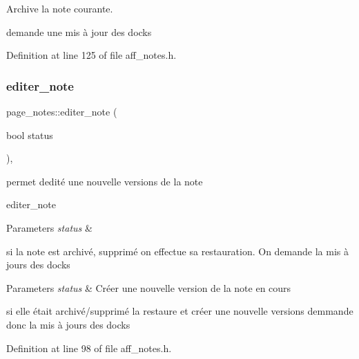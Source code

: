 Archive la note courante. 

demande une mis à jour des docks 

Definition at line 125 of file aff\+\_\+notes.\+h.

\mbox{\label{classpage__notes_a9fd367fb577c6048353f18ad56792c1f}} 
\subsubsection{\texorpdfstring{editer\+\_\+note}{editer\_note}}
{\footnotesize\ttfamily page\+\_\+notes\+::editer\+\_\+note (\begin{DoxyParamCaption}\item[{bool}]{status }\end{DoxyParamCaption})\hspace{0.3cm}{\ttfamily [inline]}, {\ttfamily [slot]}}



permet d\textquotesingle{}edité une nouvelle versions de la note 

editer\+\_\+note 
\begin{DoxyParams}{Parameters}
{\em status} & \\
\hline
\end{DoxyParams}
si la note est archivé, supprimé on effectue sa restauration. On demande la mis à jours des docks


\begin{DoxyParams}{Parameters}
{\em status} & Créer une nouvelle version de la note en cours\\
\hline
\end{DoxyParams}
si elle était archivé/supprimé la restaure et créer une nouvelle versions demmande donc la mis à jours des docks 

Definition at line 98 of file aff\+\_\+notes.\+h.

